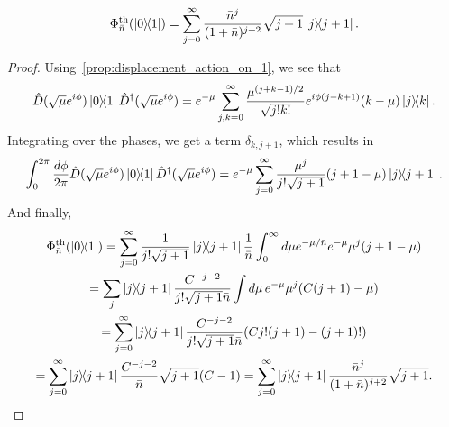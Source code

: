 \documentclass[a4paper]{report}
\begin{document}
\begin{prop}
	\begin{equation}
		\Phi^{\rm th}_{\bar n}(\ketbra{0}{1})
		= \sum_{j=0}^\infty
		\frac{\bar n^{j}}{(1+\bar n)^{j+2}} \sqrt{j+1}
		\ketbra{j}{j+1}.
	\end{equation}
\end{prop}

\begin{proof}
	Using~\cref{prop:displacement_action_on_1}, we see that
	\begin{equation}
		\hat D(\sqrt\mu e^{i\phi})\ketbra{0}{1} \hat D^\dagger(\sqrt\mu e^{i\phi})
		= e^{-\mu} \sum_{j,k=0}^\infty
		\frac{\mu^{(j+k-1)/2}}{\sqrt{j!k!}}
		e^{i\phi(j-k+1)} (k-\mu) \ketbra{j}{k}.
	\end{equation}
	Integrating over the phases, we get a term $\delta_{k,j+1}$, which results in
	\begin{equation}
		\int_0^{2\pi} \frac{d\phi}{2\pi}
		\hat D(\sqrt\mu e^{i\phi})\ketbra{0}{1} \hat D^\dagger(\sqrt\mu e^{i\phi})
		= e^{-\mu} \sum_{j=0}^\infty
		\frac{\mu^j}{j!\sqrt{j+1}} (j+1-\mu) \ketbra{j}{j+1}.
	\end{equation}
	And finally,
	\begin{equation}
	\begin{gathered}
		\Phi^{\rm th}_{\bar n}(\ketbra{0}{1})
		= \sum_{j=0}^\infty \frac{1}{j!\sqrt{j+1}} \ketbra{j}{j+1} \frac{1}{\bar n}
		\int_0^\infty d\mu
		e^{-\mu/\bar n} e^{-\mu} \mu^j (j+1-\mu) \\
		= \sum_j \ketbra{j}{j+1} \frac{C^{-j-2}}{j!\sqrt{j+1}\bar n}
		\int d\mu \, e^{-\mu} \mu^j (C(j+1) - \mu) \\
		= \sum_{j=0}^\infty \ketbra{j}{j+1} \frac{C^{-j-2}}{j!\sqrt{j+1}\bar n}
		(C j! (j+1) - (j+1)!) \\
		= \sum_{j=0}^\infty \ketbra{j}{j+1} \frac{C^{-j-2}}{\bar n} \sqrt{j+1} (C-1)
		= \sum_{j=0}^\infty \ketbra{j}{j+1}
			\frac{\bar n^{j}}{(1+\bar n)^{j+2}} \sqrt{j+1}.
	\end{gathered}
	\end{equation}
\end{proof}
\end{document}
